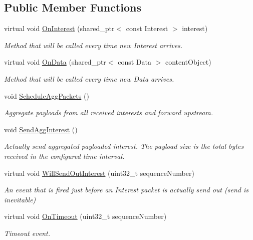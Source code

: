 \subsection*{Public Member Functions}
\begin{DoxyCompactItemize}
\item 
virtual void \hyperlink{classns3_1_1ndn_1_1Aggregator_a80c9a59e3870a53e513fab803c342bb9}{On\+Interest} (shared\+\_\+ptr$<$ const Interest $>$ interest)
\begin{DoxyCompactList}\small\item\em Method that will be called every time new Interest arrives. \end{DoxyCompactList}\item 
virtual void \hyperlink{classns3_1_1ndn_1_1Aggregator_ad9d72ff664a7dd9483abca9050bb78b7}{On\+Data} (shared\+\_\+ptr$<$ const Data $>$ content\+Object)
\begin{DoxyCompactList}\small\item\em Method that will be called every time new Data arrives. \end{DoxyCompactList}\item 
void \hyperlink{classns3_1_1ndn_1_1Aggregator_af634b71ff0feefd1e9e5d378ae0c012d}{Schedule\+Agg\+Packets} ()\hypertarget{classns3_1_1ndn_1_1Aggregator_af634b71ff0feefd1e9e5d378ae0c012d}{}\label{classns3_1_1ndn_1_1Aggregator_af634b71ff0feefd1e9e5d378ae0c012d}

\begin{DoxyCompactList}\small\item\em Aggregate payloads from all received interests and forward upstream. \end{DoxyCompactList}\item 
void \hyperlink{classns3_1_1ndn_1_1Aggregator_a190d8c2bfe205ebf4d4e421b312dfd2d}{Send\+Agg\+Interest} ()\hypertarget{classns3_1_1ndn_1_1Aggregator_a190d8c2bfe205ebf4d4e421b312dfd2d}{}\label{classns3_1_1ndn_1_1Aggregator_a190d8c2bfe205ebf4d4e421b312dfd2d}

\begin{DoxyCompactList}\small\item\em Actually send aggregated payloaded interest. The payload size is the total bytes received in the configured time interval. \end{DoxyCompactList}\item 
virtual void \hyperlink{classns3_1_1ndn_1_1Aggregator_ac488c3a7b4a9d163b4713a0ffe77406a}{Will\+Send\+Out\+Interest} (uint32\+\_\+t sequence\+Number)
\begin{DoxyCompactList}\small\item\em An event that is fired just before an Interest packet is actually send out (send is inevitable) \end{DoxyCompactList}\item 
virtual void \hyperlink{classns3_1_1ndn_1_1Aggregator_ae4689aa121eb210012d9db3a688b925d}{On\+Timeout} (uint32\+\_\+t sequence\+Number)
\begin{DoxyCompactList}\small\item\em Timeout event. \end{DoxyCompactList}\end{DoxyCompactItemize}
